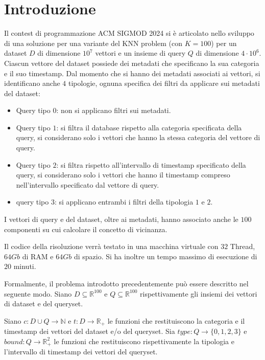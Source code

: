 \chapter{Introduzione}

Il contest di programmazione ACM SIGMOD 2024 si è articolato nello sviluppo di una soluzione 
per una variante del KNN problem (con $K=100$) per un dataset $D$ di dimensione 
$10^7$ vettori e un insieme di query $Q$ di dimensione $4\cdot 10^6$. Ciascun 
vettore del dataset possiede dei metadati che specificano la sua categoria e il
suo timestamp. Dal momento che si hanno dei metadati associati ai vettori, si 
identificano anche $4$ tipologie, ognuna specifica dei filtri da applicare sui 
metadati del dataset:
\begin{itemize}
    \item Query tipo $0$: non si applicano filtri sui metadati.
    \item Query tipo $1$: si filtra il database rispetto alla categoria specificata della query, si considerano 
    solo i vettori che hanno la stessa categoria del vettore di query.
    \item Query tipo $2$: si filtra rispetto all'intervallo di timestamp specificato della query,
    si considerano solo i vettori che hanno il timestamp compreso nell'intervallo 
    specificato dal vettore di query.
    \item query tipo $3$: si applicano entrambi i filtri della tipologia $1$ e $2$.
\end{itemize}

I vettori di query e del dataset, oltre ai metadati, hanno associato anche le $100$ 
componenti su cui calcolare il concetto di vicinanza.

Il codice della risoluzione verrà testato in una macchina virtuale con $32$ Thread,
$64Gb$ di RAM e $64Gb$ di spazio. Si ha inoltre un tempo massimo di esecuzione 
di $20$ minuti.

Formalmente, il problema introdotto precedentemente può essere descritto nel 
seguente modo. Siano $D\subseteq \mathbb{R}^{100}$ e $Q\subseteq \mathbb{R}^{100}$
rispettivamente gli insiemi dei vettori di dataset e del queryset.

Siano $c:D\cup Q\to \mathbb{N}$ e $t:D\to \mathbb{R}_+$ le funzioni che restituiscono 
la categoria e il timestamp dei vettori del dataset e/o del queryset.
Sia $type: Q\to \{0, 1, 2, 3\}$ e $bound:Q \to \mathbb{R}^2_+$ le funzioni
che restituiscono rispettivamente la tipologia e l'intervallo di timestamp dei 
vettori del queryset.

